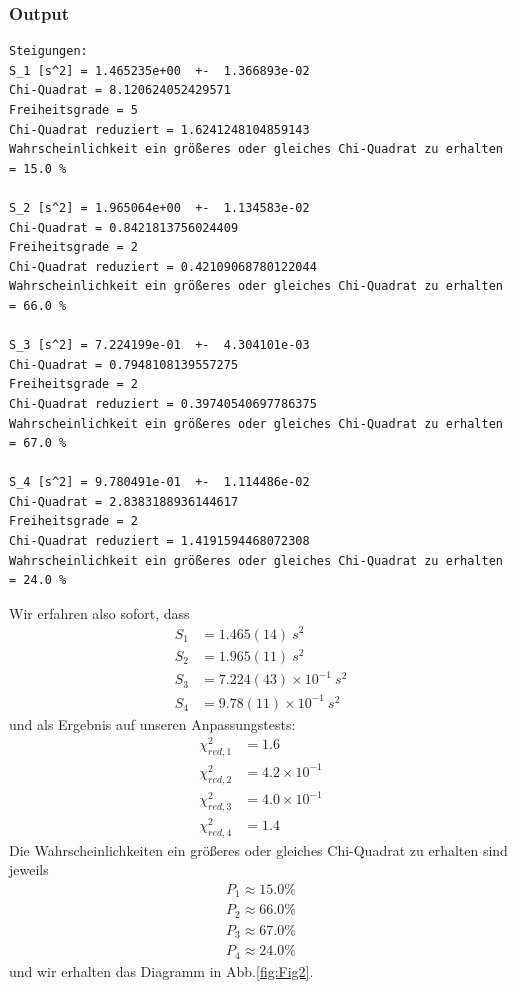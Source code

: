\documentclass[a4paper,10pt]{article}
\begin{document}
\subsubsection{Output}
\begin{lstlisting}
Steigungen: 
S_1 [s^2] = 1.465235e+00  +-  1.366893e-02
Chi-Quadrat = 8.120624052429571
Freiheitsgrade = 5
Chi-Quadrat reduziert = 1.6241248104859143
Wahrscheinlichkeit ein größeres oder gleiches Chi-Quadrat zu erhalten = 15.0 %

S_2 [s^2] = 1.965064e+00  +-  1.134583e-02
Chi-Quadrat = 0.8421813756024409
Freiheitsgrade = 2
Chi-Quadrat reduziert = 0.42109068780122044
Wahrscheinlichkeit ein größeres oder gleiches Chi-Quadrat zu erhalten = 66.0 %

S_3 [s^2] = 7.224199e-01  +-  4.304101e-03
Chi-Quadrat = 0.7948108139557275
Freiheitsgrade = 2
Chi-Quadrat reduziert = 0.39740540697786375
Wahrscheinlichkeit ein größeres oder gleiches Chi-Quadrat zu erhalten = 67.0 %

S_4 [s^2] = 9.780491e-01  +-  1.114486e-02
Chi-Quadrat = 2.8383188936144617
Freiheitsgrade = 2
Chi-Quadrat reduziert = 1.4191594468072308
Wahrscheinlichkeit ein größeres oder gleiches Chi-Quadrat zu erhalten = 24.0 %

\end{lstlisting}
Wir erfahren also sofort, dass
\begin{align*}
S_1&=1.465(14)\: s^2\\
S_2&=1.965(11)\: s^2\\
S_3&=7.224(43)\times10^{-1}\: s^2\\
S_4&=9.78(11)\times10^{-1}\: s^2
\end{align*}
und als Ergebnis auf unseren Anpassungstests:
\begin{align*}
\chi^{2}_{red,1}&=1.6\\
\chi^{2}_{red,2}&=4.2\times10^{-1}\\
\chi^{2}_{red,3}&=4.0\times10^{-1}\\
\chi^{2}_{red,4}&=1.4
\end{align*}
Die Wahrscheinlichkeiten ein größeres oder gleiches Chi-Quadrat zu erhalten sind jeweils
\begin{align*}
P_1\approx  15.0 \%\\
P_2\approx  66.0 \%\\
P_3\approx  67.0 \%\\
P_4\approx  24.0 \%
\end{align*}
und wir erhalten das Diagramm in Abb.\ref{fig:Fig2}.
\end{document}
